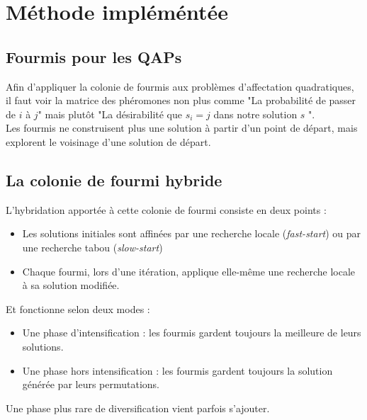 \documentclass[b]{beamer}
\begin{document}
\section{Méthode impléméntée}
\subsection{Fourmis pour les QAPs}
\begin{frame}

Afin d'appliquer la colonie de fourmis aux problèmes d'affectation quadratiques, il faut voir la matrice des phéromones non plus comme "La probabilité de passer de $i$ à $j$" mais plutôt "La désirabilité que $s_i=j$ dans notre solution $s$ ". \\
Les fourmis ne construisent plus une solution à partir d'un point de départ, mais explorent le voisinage d'une solution de départ.\\
\end{frame}

\subsection{La colonie de fourmi hybride}
\begin{frame}
L'hybridation apportée à cette colonie de fourmi consiste en deux points :\\
	\begin{itemize}
	\item Les solutions initiales sont affinées par une recherche locale (\emph{fast-start}) ou par une recherche tabou (\emph{slow-start})\\
	\item Chaque fourmi, lors d'une itération, applique elle-même une recherche locale à sa solution modifiée.\\
	\end{itemize}
Et fonctionne selon deux modes :
	\begin{itemize}
	\item Une phase d'intensification : les fourmis gardent toujours la meilleure de leurs solutions.
	\item Une phase hors intensification : les fourmis gardent toujours la solution générée par leurs permutations.\\[.5cm]
	\end{itemize}
Une phase plus rare de diversification vient parfois s'ajouter.
\end{frame}
\end{document}

